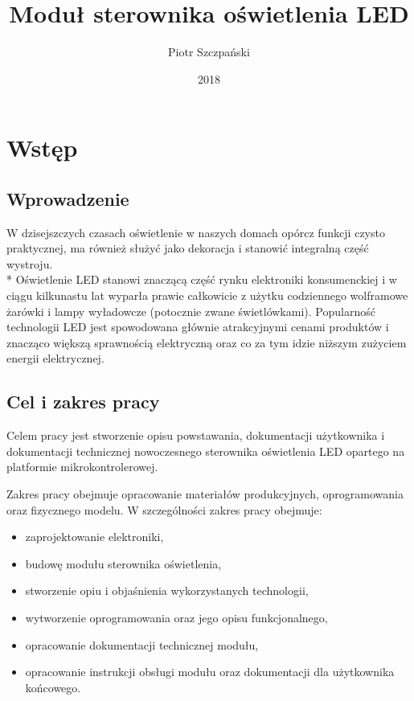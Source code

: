 \documentclass[12pt, eng, twoside, openany, final]{mgr}
\author{Piotr Szczpański}
\title{Moduł sterownika oświetlenia LED}
\date{2018}
\begin{document}
\maketitle
\tableofcontents
\newpage

\pagestyle{fancy}
\fancyhead{} 
\fancyfoot{} 
\rfoot{\thepage}


\chapter{Wstęp}
\thispagestyle{fancy}
    \section{Wprowadzenie}
    W dzisejszczych czasach oświetlenie w naszych domach opórcz funkcji czysto praktycznej, ma również służyć jako dekoracja i stanowić integralną część wystroju. \\*
    Oświetlenie LED stanowi znaczącą część rynku elektroniki konsumenckiej i w ciągu kilkunastu lat wyparła prawie całkowicie z użytku codziennego wolframowe żarówki i lampy wyładowcze (potocznie zwane świetlówkami). Popularność technologii LED jest spowodowana głównie atrakcyjnymi cenami produktów i znacząco większą sprawnością elektryczną oraz co za tym idzie niższym zużyciem energii elektrycznej.
    
    \section{Cel i zakres pracy}
    Celem pracy jest stworzenie opisu powstawania, dokumentacji użytkownika i dokumentacji technicznej nowoczesnego sterownika oświetlenia LED opartego na platformie mikrokontrolerowej.
    
    Zakres pracy obejmuje opracowanie materiałów produkcyjnych, oprogramowania oraz fizycznego modelu. W szczególności zakres pracy obejmuje: 
    \begin{itemize}
        \item zaprojektowanie elektroniki, 
        \item budowę modułu sterownika oświetlenia,
        \item stworzenie opiu i objaśnienia wykorzystanych technologii,
        \item wytworzenie oprogramowania oraz jego opisu funkcjonalnego,
        \item opracowanie dokumentacji technicznej modułu,
        \item opracowanie instrukcji obsługi modułu oraz dokumentacji dla użytkownika końcowego.
    \end{itemize}
%
\end{document}
